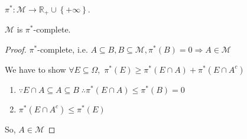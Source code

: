 ${\pi ^*}:\mathcal{M} \to {\mathbb{R}_ + } \cup \left\{ { + \infty } \right\}$.

\begin{claim}
	$ \mathcal{M} $ is ${{\pi ^*}}$-complete.
	\label{cla8.2}
\end{claim}

\begin{proof}
	${\pi ^*}$-complete, i.e.  $  A \subseteq B,B \subseteq \mathcal{M},{\pi ^*}\left( B \right) = 0 \Rightarrow A \in \mathcal{M}$
	
	We have to show $ \forall E \subseteq \Omega,  $ ${\pi ^*}\left( E \right) \geqslant {\pi ^*}\left( {E \cap A} \right) + {\pi ^*}\left( {E \cap {A^c}} \right)$
	\begin{enumerate}
		\item $\because E \cap A \subseteq A \subseteq B\;\therefore {\pi ^*}\left( {E \cap A} \right) \leqslant {\pi ^*}\left( B \right) = 0$
		\item ${\pi ^*}\left( {E \cap {A^c}} \right) \leqslant {\pi ^*}\left( E \right)$
	\end{enumerate}
   So, $ A \in \mathcal{M} $
\end{proof}
